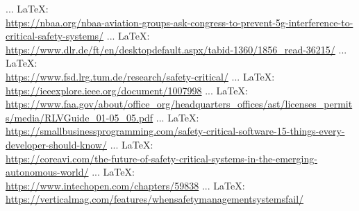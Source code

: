 \begin{thebibliography}{99}
{{{{{{{{							 ... \LaTeX:\\ \url{https://nbaa.org/nbaa-aviation-groups-ask-congress-to-prevent-5g-interference-to-critical-safety-systems/}
							 ... \LaTeX:\\ \url{https://www.dlr.de/ft/en/desktopdefault.aspx/tabid-1360/1856_read-36215/}
							 ... \LaTeX:\\ \url{https://www.fsd.lrg.tum.de/research/safety-critical/}
							 ... \LaTeX:\\ \url{https://ieeexplore.ieee.org/document/1007998}
							 ... \LaTeX:\\ \url{https://www.faa.gov/about/office_org/headquarters_offices/ast/licenses_permits/media/RLVGuide_01-05_05.pdf}
							 ... \LaTeX:\\ \url{https://smallbusinessprogramming.com/safety-critical-software-15-things-every-developer-should-know/}
							 ... \LaTeX:\\ \url{https://coreavi.com/the-future-of-safety-critical-systems-in-the-emerging-autonomous-world/}
							 ... \LaTeX:\\ \url{https://www.intechopen.com/chapters/59838}
							 ... \LaTeX:\\ \url{https://verticalmag.com/features/whensafetymanagementsystemsfail/}
							
}}}}}}}}
\end{thebibliography}
